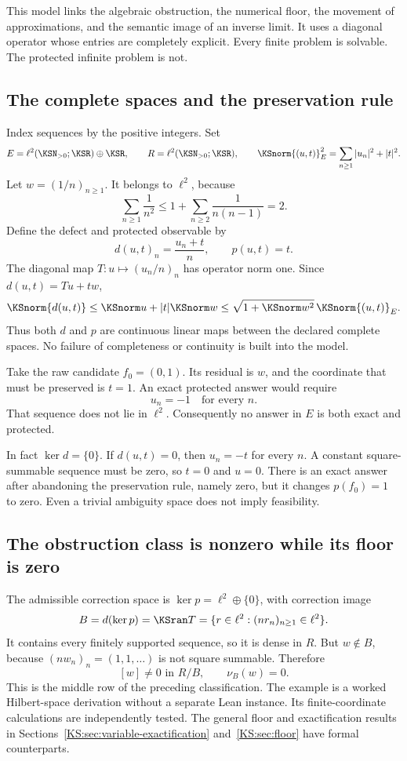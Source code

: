 \label{KS:sec:escape}
This model links the algebraic obstruction, the numerical floor, the movement of approximations, and the semantic image of an inverse limit. It uses a diagonal operator whose entries are completely explicit. Every finite problem is solvable. The protected infinite problem is not.

\subsection{The complete spaces and the preservation rule}
Index sequences by the positive integers. Set
\[
 E=\ell^2(\KSN_{>0};\KSR)\oplus\KSR,\qquad
 R=\ell^2(\KSN_{>0};\KSR),\qquad
 \KSnorm{(u,t)}_E^2=\sum_{n\ge1}|u_n|^2+|t|^2.
\]
Let \(w=(1/n)_{n\ge1}\). It belongs to \(\ell^2\), because
\[
 \sum_{n\ge1}\frac1{n^2}
 \le1+\sum_{n\ge2}\frac1{n(n-1)}=2.
\]
Define the defect and protected observable by
\[
 d(u,t)_n=\frac{u_n+t}{n},\qquad p(u,t)=t.
\]
The diagonal map \(T:u\mapsto(u_n/n)_n\) has operator norm one. Since \(d(u,t)=Tu+tw\),
\[
 \KSnorm{d(u,t)}\le\KSnorm u+|t|\KSnorm w
 \le\sqrt{1+\KSnorm w^2}\,\KSnorm{(u,t)}_E.
\]
Thus both \(d\) and \(p\) are continuous linear maps between the declared complete spaces. No failure of completeness or continuity is built into the model.

Take the raw candidate \(f_0=(0,1)\). Its residual is \(w\), and the coordinate that must be preserved is \(t=1\). An exact protected answer would require
\[
 u_n=-1\quad\text{for every }n.
\]
That sequence does not lie in \(\ell^2\). Consequently no answer in \(E\) is both exact and protected.

In fact \(\ker d=\{0\}\). If \(d(u,t)=0\), then \(u_n=-t\) for every \(n\). A constant square-summable sequence must be zero, so \(t=0\) and \(u=0\). There is an exact answer after abandoning the preservation rule, namely zero, but it changes \(p(f_0)=1\) to zero. Even a trivial ambiguity space does not imply feasibility.

\subsection{The obstruction class is nonzero while its floor is zero}
The admissible correction space is \(\ker p=\ell^2\oplus\{0\}\), with correction image
\[
 B=d(\ker p)=\KSran T
  =\{r\in\ell^2:(nr_n)_{n\ge1}\in\ell^2\}.
\]
It contains every finitely supported sequence, so it is dense in \(R\). But \(w\notin B\), because \((nw_n)_n=(1,1,\ldots)\) is not square summable. Therefore
\[
 [w]\ne0\text{ in }R/B,\qquad \nu_B(w)=0.
\]
This is the middle row of the preceding classification. The example is a worked Hilbert-space derivation without a separate Lean instance. Its finite-coordinate calculations are independently tested. The general floor and exactification results in Sections~\ref{KS:sec:variable-exactification} and~\ref{KS:sec:floor} have formal counterparts.

